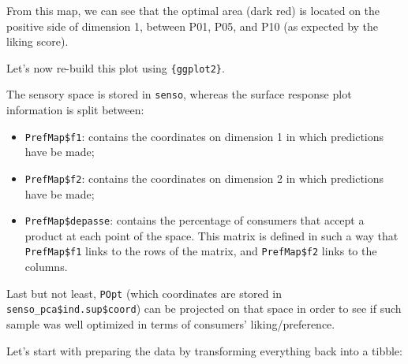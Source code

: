 \documentclass[
]{book}
\providecommand{\tightlist}{%
  \setlength{\itemsep}{0pt}\setlength{\parskip}{0pt}}
\begin{document}
From this map, we can see that the optimal area (dark red) is located on the positive side of dimension 1, between P01, P05, and P10 (as expected by the liking score).

Let's now re-build this plot using \texttt{\{ggplot2\}}.

The sensory space is stored in \texttt{senso}, whereas the surface response plot information is split between:

\begin{itemize}
\tightlist
\item
  \texttt{PrefMap\$f1}: contains the coordinates on dimension 1 in which predictions have be made;
\item
  \texttt{PrefMap\$f2}: contains the coordinates on dimension 2 in which predictions have be made;
\item
  \texttt{PrefMap\$depasse}: contains the percentage of consumers that accept a product at each point of the space. This matrix is defined in such a way that \texttt{PrefMap\$f1} links to the rows of the matrix, and \texttt{PrefMap\$f2} links to the columns.
\end{itemize}

Last but not least, \texttt{POpt} (which coordinates are stored in \texttt{senso\_pca\$ind.sup\$coord}) can be projected on that space in order to see if such sample was well optimized in terms of consumers' liking/preference.

Let's start with preparing the data by transforming everything back into a tibble:
\end{document}
